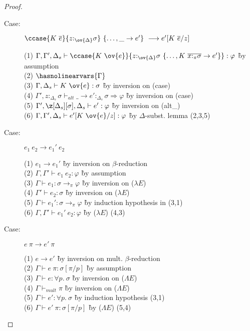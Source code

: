 \begin{proof}
\begin{description}
\item[Case:]
    $\ccase{K~\overline{e}}{z{:}_{\ov{\Delta}}\sigma}~\{\dots,\_\to e'\}\ \longrightarrow e'[K~\overline{e}/z]$
\begin{tabbing}
(1) $\Gamma,\Gamma',\Delta_s \vdash \ccase{K~\ov{e}}{z{:}_{\ov{\Delta}}\sigma~\{\dots,K~\overline{x{:}_\pi\sigma}\to e'\}} : \varphi$ \` by assumption \\
(2) $\hasnolinearvars{\Gamma}$\\
(3) $\Gamma, \Delta_s \vdash K~\ov{e} : \sigma$ \` by inversion on (case) \\
(4) $\Gamma', z{:}_{\Delta_s}\sigma \vdash_{alt} \_ \to e' :_{\Delta_s} \sigma \Longrightarrow \varphi$ \` by inversion on (case) \\
(5) $\Gamma', \z[\Delta_s][\sigma], \Delta_s \vdash e' : \varphi$ \` by inversion on (alt\_)\\
(6) $\Gamma, \Gamma', \Delta_s \vdash e'[K~\ov{e}/z] : \varphi$ \` by $\Delta$-subst. lemma (2,3,5)
\end{tabbing}

\item[Case:] $e_1~e_2 \longrightarrow e_1'~e_2$
\begin{tabbing}
(1) $e_1 \longrightarrow e_1'$ \` by inversion on $\beta$-reduction \\
(2) $\Gamma,\Gamma' \vdash e_1~e_2 : \varphi$ \` by assumption \\
(3) $\Gamma \vdash e_1 : \sigma \to_\pi \varphi$ \` by inversion on ($\lambda E$) \\
(4) $\Gamma' \vdash e_2 : \sigma$ \` by inversion on ($\lambda E$) \\
(5) $\Gamma \vdash e_1' : \sigma \to_\pi \varphi$ \` by induction hypothesis in (3,1) \\
(6) $\Gamma, \Gamma' \vdash e_1'~e_2 : \varphi$ \` by ($\lambda E$) (4,3) \\
\end{tabbing}

\item[Case:] $e~\pi \longrightarrow e'~\pi$
\begin{tabbing}
(1) $e \longrightarrow e'$ \` by inversion on mult. $\beta$-reduction \\
(2) $\Gamma \vdash e~\pi : \sigma[\pi/p]$ \` by assumption \\
(3) $\Gamma \vdash e : \forall p.~\sigma$ \` by inversion on ($\Lambda E$) \\
(4) $\Gamma \vdash_{mult} \pi$ \` by inversion on ($\Lambda E$) \\
(5) $\Gamma \vdash e' : \forall p.~\sigma$ \` by induction hypothesis (3,1) \\
(6) $\Gamma \vdash e'~\pi : \sigma[\pi/p]$ \` by ($\Lambda E$) (5,4) \\
\end{tabbing}


\end{description}
\end{proof}
